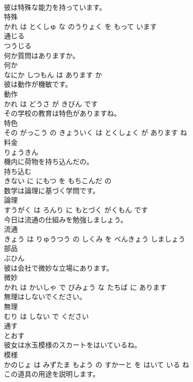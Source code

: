 \documentclass[8pt]{extreport}
\begin{document}
\begin{CJK}{UTF8}{min}
\\	彼は特殊な能力を持っています。	
\\	特殊 
\\	かれ は とくしゅ な のうりょく を もって います			
\\	通じる	
\\	つうじる		
\\	何か質問はありますか。	
\\	何か 
\\	なにか しつもん は あります か			
\\	彼は動作が機敏です。	
\\	動作 
\\	かれ は どうさ が きびん です			
\\	その学校の教育は特色がありますね。	
\\	特色 
\\	その がっこう の きょういく は とくしょく が あります ね			
\\	料金	
\\	りょうきん		
\\	機内に荷物を持ち込んだの。	
\\	持ち込む 
\\	きない に にもつ を もちこんだ の			
\\	数学は論理に基づく学問です。	
\\	論理 
\\	すうがく は ろんり に もとづく がくもん です			
\\	今日は流通の仕組みを勉強しましょう。	
\\	流通 
\\	きょう は りゅうつう の しくみ を べんきょう しましょう			
\\	部品	
\\	ぶひん		
\\	彼は会社で微妙な立場にあります。	
\\	微妙 
\\	かれ は かいしゃ で びみょう な たちば に あります			
\\	無理はしないでください。	
\\	無理 
\\	むり は しない で ください			
\\	通す	
\\	とおす		
\\	彼女は水玉模様のスカートをはいているね。	
\\	模様 
\\	かのじょ は みずたま もよう の すかーと を はいて いる ね			
\\	この道具の用途を説明します。	

\end{CJK}
\end{document}
